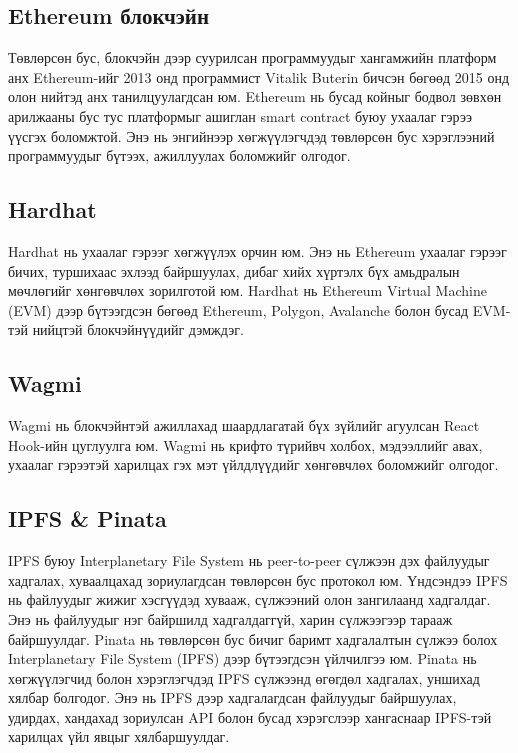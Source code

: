 \subsection{Ethereum блокчэйн}
Төвлөрсөн бус, блокчэйн дээр суурилсан программуудыг хангамжийн платформ анх Ethereum-ийг 2013 онд программист Vitalik Buterin бичсэн бөгөөд 2015 онд олон нийтэд анх танилцуулагдсан юм. Ethereum нь бусад койныг бодвол зөвхөн арилжааны бус тус платформыг ашиглан smart contract буюу ухаалаг гэрээ үүсгэх боломжтой. Энэ нь энгийнээр хөгжүүлэгчдэд төвлөрсөн бус хэрэглээний программуудыг бүтээх, ажиллуулах боломжийг олгодог.

\subsection{Hardhat}
Hardhat нь ухаалаг гэрээг хөгжүүлэх орчин юм. Энэ нь Ethereum ухаалаг гэрээг бичих, туршихаас эхлээд байршуулах, дибаг хийх хүртэлх бүх амьдралын мөчлөгийг хөнгөвчлөх зорилготой юм. Hardhat нь Ethereum Virtual Machine (EVM) дээр бүтээгдсэн бөгөөд Ethereum, Polygon, Avalanche болон бусад EVM-тэй нийцтэй блокчэйнүүдийг дэмждэг.

\subsection{Wagmi}
Wagmi нь блокчэйнтэй ажиллахад шаардлагатай бүх зүйлийг агуулсан React Hook-ийн цуглуулга юм. Wagmi нь крифто түрийвч холбох, мэдээллийг авах, ухаалаг гэрээтэй харилцах гэх мэт үйлдлүүдийг хөнгөвчлөх боломжийг олгодог.

\subsection{IPFS \& Pinata}
IPFS буюу Interplanetary File System нь peer-to-peer сүлжээн дэх файлуудыг хадгалах, хуваалцахад зориулагдсан төвлөрсөн бус протокол юм. Үндсэндээ IPFS нь файлуудыг жижиг хэсгүүдэд хувааж, сүлжээний олон зангилаанд хадгалдаг. Энэ нь файлуудыг нэг байршилд хадгалдаггүй, харин сүлжээгээр тарааж байршуулдаг.
Pinata нь төвлөрсөн бус бичиг баримт хадгалалтын сүлжээ болох Interplanetary File System (IPFS) дээр бүтээгдсэн үйлчилгээ юм. Pinata нь хөгжүүлэгчид болон хэрэглэгчдэд IPFS сүлжээнд өгөгдөл хадгалах, уншихад хялбар болгодог. Энэ нь IPFS дээр хадгалагдсан файлуудыг байршуулах, удирдах, хандахад зориулсан API болон бусад хэрэгслээр хангаснаар IPFS-тэй харилцах үйл явцыг хялбаршуулдаг.

